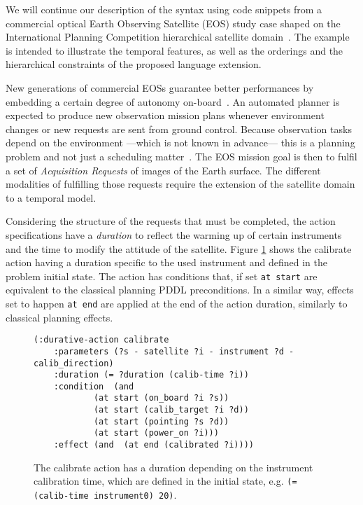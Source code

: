 \documentclass[letterpaper]{article} %
\begin{document}

We will continue our description of the syntax using code snippets from a commercial optical Earth Observing Satellite (EOS) study case shaped on the International Planning Competition hierarchical satellite domain~\citep{schattenberg2020}. The example is intended to illustrate the temporal features, as well as the orderings and the hierarchical constraints of the proposed language extension.

New generations of commercial EOSs guarantee better performances by embedding a certain degree of autonomy on-board~\citep{pralet2019}. An automated planner is expected to produce new observation mission plans whenever environment changes or new requests are sent from ground control. Because observation tasks depend on the environment ---which is not known in advance--- this is a planning problem and not just a scheduling matter~\citep{rodriguez-moreno2004}.
%
The EOS mission goal is then to fulfil a set of \emph{Acquisition Requests} of images of the Earth surface.
The different modalities of fulfilling those requests require the extension of the satellite domain to a temporal model.

Considering the structure of the requests that must be completed,
the action specifications have a \emph{duration} to reflect the warming up of certain instruments and the time to modify the attitude of the satellite. Figure \ref{pddl_calibrate} shows the calibrate action having a duration specific to the used instrument and defined in the problem initial state.
%
The action has conditions that, if set \texttt{at start} are equivalent to the classical planning PDDL preconditions. In a similar way, effects set to happen \texttt{at end} are applied at the end of the action duration, similarly to classical planning effects.


\begin{figure}[!h]
	\begin{lstlisting}[language=pddl,mathescape]
(:durative-action calibrate
	:parameters (?s - satellite ?i - instrument ?d - calib_direction)
	:duration (= ?duration (calib-time ?i))
	:condition 	(and
			(at start (on_board ?i ?s))
			(at start (calib_target ?i ?d))
			(at start (pointing ?s ?d))
			(at start (power_on ?i)))
	:effect (and  (at end (calibrated ?i))))
	\end{lstlisting}
	\caption{The calibrate action has a duration depending on the instrument calibration time\label{pddl_calibrate}, which are defined in the initial state, e.g.
{\small\lstinline[language={pddl},basicstyle=\ttfamily]|(= (calib-time instrument0) 20)|}.}
\end{figure}
\end{document}
